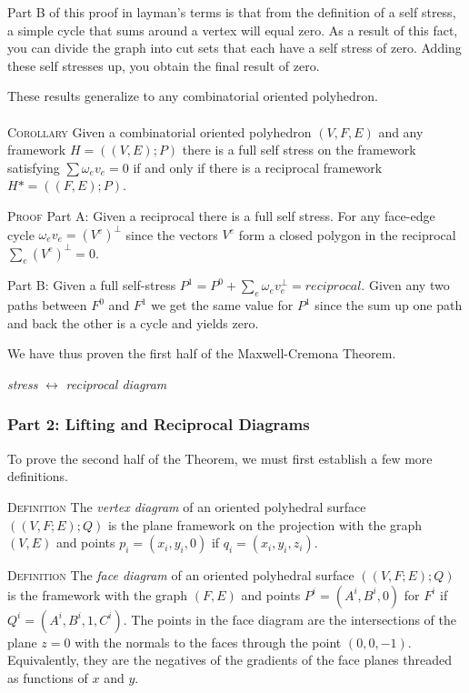 \documentclass[11pt]{article}
\theoremstyle{definition}
\begin{document}
Part B of this proof in layman's terms is that from the definition of a self stress, a simple cycle that sums around a vertex will equal zero. As a result of this fact, you can divide the graph into cut sets that each have a self stress of zero. Adding these self stresses up, you obtain the final result of zero.

These results generalize to any combinatorial oriented polyhedron. \\
\\
\textsc{Corollary} Given a combinatorial oriented polyhedron $(V,F,E)$ and any framework $H = ((V,E);P)$ there is a full self stress on the framework satisfying $\sum \omega_ev_e = 0$ if and only if there is a reciprocal framework $H* = ((F,E);P)$. 

\textsc{Proof} Part A: Given a reciprocal there is a full self stress.
For any face-edge cycle $\omega_e v_e = (V^e)^{\bot}$ since the vectors $V^e$ form a closed polygon in the reciprocal $\sum_e(V^e)^\bot = 0$.

Part B: Given a full self-stress $P^1 = P^0 + \sum_e \omega_ev_e^\bot = reciprocal$.
Given any two paths between $F^0$ and $F^1$ we get the same value for $P^1$ since the sum up one path and back the other is a cycle and yields zero.

We have thus proven the first half of the Maxwell-Cremona Theorem.

\emph{stress} $\leftrightarrow$ \emph{reciprocal diagram}

\subsubsection{Part 2: Lifting and Reciprocal Diagrams}
To prove the second half of the Theorem, we must first establish a few more definitions.

\textsc{Definition} The \emph{vertex diagram} of an oriented polyhedral surface $((V,F;E);Q)$ is the plane framework on the projection with the graph $(V,E)$ and points $p_i = (x_i,y_i,0)$ if $q_i = (x_i,y_i,z_i)$.


\textsc{Definition} The \emph{face diagram} of an oriented polyhedral surface $((V,F;E);Q)$ is the framework with the graph $(F,E)$ and points $P^i = (A^i,B^i,0)$ for $F^i$ if $Q^i = (A^i,B^i,1,C^i)$. The points in the face diagram are the intersections of the plane $z=0$ with the normals to the faces through the point $(0,0,-1)$. Equivalently, they are the negatives of the gradients of the face planes threaded as functions of $x$ and $y$.
 
\end{document}
